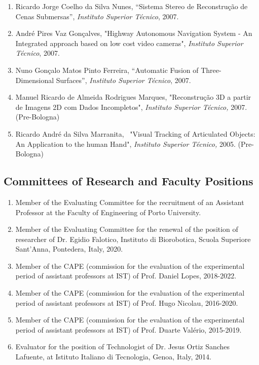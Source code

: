 \begin{enumerate}
  Ricardo Daniel Rita Beira, ``Mechanical Design of an Anthropomorphic
  Robot Head'', \emph{Instituto Superior Técnico,} 2008.~ (Pre-Bologna)
\item
  Ricardo Jorge Coelho da Silva Nunes, ``Sistema Stereo de Reconstrução
  de Cenas Submersas'', \emph{Instituto Superior Técnico}, 2007.
\item
  André Pires Vaz Gonçalves, "Highway Autonomous Navigation System - An
  Integrated approach based on low cost video cameras", \emph{Instituto
  Superior Técnico}, 2007.
\item
  Nuno Gonçalo Matos Pinto Ferreira, ``Automatic Fusion of
  Three-Dimensional Surfaces'', \emph{Instituto Superior Técnico}, 2007.
\item
  Manuel Ricardo de Almeida Rodrigues Marques, "Reconstrução 3D a partir
  de Imagens 2D com Dados Incompletos", \emph{Instituto Superior
  Técnico,} 2007.~ (Pre-Bologna)
\item
  Ricardo André da Silva Marranita,~ "Visual Tracking of Articulated
  Objects: An Application to the human Hand", \emph{Instituto Superior
  Técnico,} 2005. (Pre-Bologna)
\end{enumerate}

\subsection{Committees of Research and Faculty
Positions}\label{committees-of-research-and-faculty-positions}

\begin{enumerate}
\def\labelenumi{\arabic{enumi}.}
\item
  Member of the Evaluating Committee for the recruitment of an Assistant
  Professor at the Faculty of Engineering of Porto University.
\item
  Member of the Evaluating Committee for the renewal of the position of
  researcher of Dr. Egidio Falotico, Instituto di Biorobotica, Scuola
  Superiore Sant'Anna, Pontedera, Italy, 2020.
\item
  Member of the CAPE (commission for the evaluation of the experimental
  period of assistant professors at IST) of Prof. Daniel Lopes,
  2018-2022.
\item
  Member of the CAPE (commission for the evaluation of the experimental
  period of assistant professors at IST) of Prof. Hugo Nicolau,
  2016-2020.
\item
  Member of the CAPE (commission for the evaluation of the experimental
  period of assistant professors at IST) of Prof. Duarte Valério,
  2015-2019.
\item
  Evaluator for the position of Technologist of Dr. Jesus Ortiz Sanches
  Lafuente, at Istituto Italiano di Tecnologia, Genoa, Italy, 2014.
\end{enumerate}

